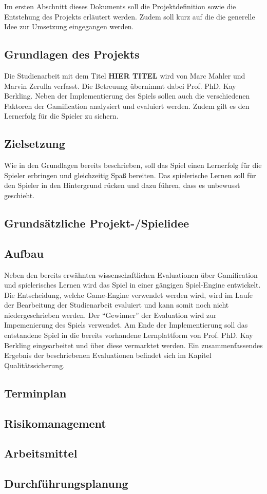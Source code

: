 Im ersten Abschnitt dieses Dokuments soll die Projektdefinition sowie die Entstehung des Projekts erläutert werden. Zudem soll kurz auf die die generelle Idee zur Umsetzung eingegangen werden.

\subsection{Grundlagen des Projekts}
Die Studienarbeit mit dem Titel \textbf{HIER TITEL} wird von Marc Mahler und Marvin Zerulla verfasst. Die Betreuung übernimmt dabei Prof. PhD. Kay Berkling. Neben der Implementierung des Spiels sollen auch die verschiedenen Faktoren der Gamification analysiert und evaluiert werden. Zudem gilt es den Lernerfolg für die Spieler zu sichern.

\subsection{Zielsetzung}
Wie in den Grundlagen bereits beschrieben, soll das Spiel einen Lernerfolg für die Spieler erbringen und gleichzeitig Spaß bereiten.
Das spielerische Lernen soll für den Spieler in den Hintergrund rücken und dazu führen, dass es unbewusst geschieht.

\subsection{Grundsätzliche Projekt-/Spielidee}


\subsection{Aufbau}
Neben den bereits erwähnten wissenschaftlichen Evaluationen über Gamification und spielerisches Lernen wird das Spiel in einer gängigen Spiel-Engine entwickelt.
Die Entscheidung, welche Game-Engine verwendet werden wird, wird im Laufe der Bearbeitung der Studienarbeit evaluiert und kann somit noch nicht niedergeschrieben werden. Der \enquote{Gewinner} der Evaluation wird zur Impemenierung des Spiels verwendet.
Am Ende der Implementierung soll das entstandene Spiel in die bereits vorhandene Lernplattform von Prof. PhD. Kay Berkling eingearbeitet und über diese vermarktet werden.
Ein zusammenfassendes Ergebnis der beschriebenen Evaluationen befindet sich im Kapitel Qualitätssicherung.

\subsection{Terminplan}


\subsection{Risikomanagement}

\subsection{Arbeitsmittel}

\subsection{Durchführungsplanung}